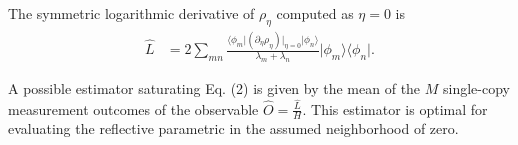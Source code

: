 \documentclass[../../note.tex]{subfiles}
\begin{document}
\begin{definition}
    The symmetric logarithmic derivative of $\rho_{\eta}$ computed as $\eta = 0$ is 
    \begin{align}
        \hat{L}
        &= 2 \sum_{m n} \frac{\langle \phi_{m} \vert (\partial_{\eta} \rho_{\eta})\vert_{\eta = 0}\vert \phi_n \rangle}{\lambda_m + \lambda_n} \vert \phi_m \rangle \langle \phi_n \vert.
    \end{align}
\end{definition}

\begin{lemma}
    A possible estimator saturating Eq. (2) is given by the mean of the $M$ single-copy measurement outcomes of the observable $\hat{O} = \frac{\hat{L}}{H}$. This estimator is optimal for evaluating the reflective parametric in the assumed neighborhood of zero.
\end{lemma}
\end{document}
